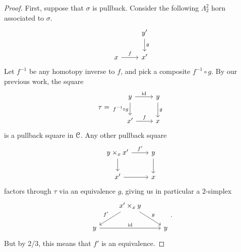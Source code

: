\documentclass[main.tex]{subfiles}
\begin{document}
\begin{proof}
  First, suppose that $\sigma$ is pullback. Consider the following $\Lambda^{2}_{2}$ horn associated to $\sigma$.
  \begin{equation*}
    \begin{tikzcd}
      & y'
      \arrow[d, "g"]
      \\
      x
      \arrow[r, "f"]
      & x'
    \end{tikzcd}
  \end{equation*}
  Let $f^{-1}$ be any homotopy inverse to $f$, and pick a composite $f^{-1} \circ g$. By our previous work, the square
  \begin{equation*}
    \tau =
    \begin{tikzcd}
      y
      \arrow[r, "\id"]
      \arrow[d, swap, "f^{-1} \circ g"]
      & y
      \arrow[d, "g"]
      \\
      x'
      \arrow[r, "f"]
      & x
    \end{tikzcd}
  \end{equation*}
  is a pullback square in $\mathcal{C}$. Any other pullback square
  \begin{equation*}
    \begin{tikzcd}
      y \times_{x} x'
      \arrow[r, "f'"]
      \arrow[d]
      & y
      \arrow[d]
      \\
      x'
      \arrow[r]
      & x
    \end{tikzcd}
  \end{equation*}
  factors through $\tau$ via an equivalence $g$, giving us in particular a $2$-simplex
  \begin{equation*}
    \begin{tikzcd}
      & x' \times_{x} y
      \arrow[dr, "g"]
      \arrow[dl, swap, "f'"]
      \\
      y
      \arrow[rr, "\id"]
      && y
    \end{tikzcd}.
  \end{equation*}
  But by 2/3, this means that $f'$ is an equivalence.

\end{proof}
\end{document}
